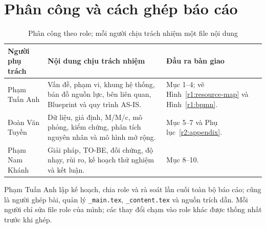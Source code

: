 
\FloatBarrier

\FloatBarrier

\FloatBarrier

{}


\appendix
\section{Phân công và cách ghép báo cáo}
\label{app:roles}
\begin{table}[H]\centering\small
\caption{Phân công theo role; mỗi người chịu trách nhiệm một file nội dung}
\begin{tabularx}{\linewidth}{@{}p{30mm}Y Y@{}}
\toprule
Người phụ trách & Nội dung chịu trách nhiệm & Đầu ra bàn giao \\
\midrule
Phạm Tuấn Anh & Vấn đề, phạm vi, khung hệ thống, bản đồ nguồn lực, bên liên quan, Blueprint và quy trình AS-IS. & Mục 1--4; vẽ Hình~\ref{r1:resource-map} và Hình~\ref{r1:bpmn}. \\
Đoàn Văn Tuyền & Dữ liệu, giả định, M/M/c, mô phỏng, kiểm chứng, phân tích nguyên nhân và mô hình mở rộng. & Mục 5--7 và Phụ lục~\ref{r2:appendix}. \\
Phạm Nam Khánh & Giải pháp, TO-BE, đối chứng, độ nhạy, rủi ro, kế hoạch thử nghiệm và kết luận. & Mục 8--10. \\
\bottomrule
\end{tabularx}
\end{table}
Phạm Tuấn Anh lập kế hoạch, chia role và rà soát lần cuối toàn bộ báo cáo;
cũng là người ghép bài, quản lý \texttt{\_main.tex}, \texttt{\_content.tex} và
nguồn trích dẫn. Mỗi người chỉ sửa file role của mình; các thay đổi chạm vào
role khác được thống nhất trước khi ghép.



